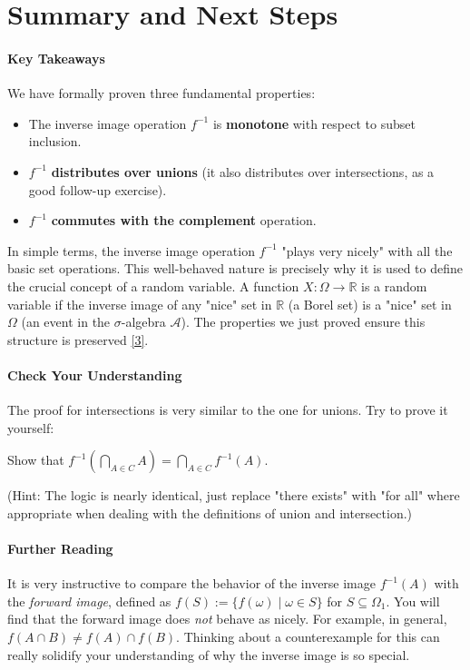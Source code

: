 \documentclass[11pt,a4paper]{article}
\newcommand{\myref}[2]{\hyperlink{#1}{\color{red!80!black}[#2]}}
\begin{document}
\section*{Summary and Next Steps}

\paragraph{Key Takeaways}
We have formally proven three fundamental properties:
\begin{itemize}
    \item The inverse image operation $f^{-1}$ is \textbf{monotone} with respect to subset inclusion.
    \item $f^{-1}$ \textbf{distributes over unions} (it also distributes over intersections, as a good follow-up exercise).
    \item $f^{-1}$ \textbf{commutes with the complement} operation.
\end{itemize}
In simple terms, the inverse image operation $f^{-1}$ "plays very nicely" with all the basic set operations. This well-behaved nature is precisely why it is used to define the crucial concept of a random variable. A function $X: \Omega \to \mathbb{R}$ is a random variable if the inverse image of any "nice" set in $\mathbb{R}$ (a Borel set) is a "nice" set in $\Omega$ (an event in the $\sigma$-algebra $\mathcal{A}$). The properties we just proved ensure this structure is preserved \myref{ref:sigma_algebra}{3}.

\paragraph{Check Your Understanding}
The proof for intersections is very similar to the one for unions. Try to prove it yourself:
\begin{center}
    Show that \quad $f^{-1}\left(\bigcap_{A \in C} A\right) = \bigcap_{A \in C} f^{-1}(A)$.
\end{center}
(Hint: The logic is nearly identical, just replace "there exists" with "for all" where appropriate when dealing with the definitions of union and intersection.)

\paragraph{Further Reading}
It is very instructive to compare the behavior of the inverse image $f^{-1}(A)$ with the \textit{forward image}, defined as $f(S) := \{f(\omega) \mid \omega \in S\}$ for $S \subseteq \Omega_1$. You will find that the forward image does \textit{not} behave as nicely. For example, in general, $f(A \cap B) \neq f(A) \cap f(B)$. Thinking about a counterexample for this can really solidify your understanding of why the inverse image is so special.
\end{document}
